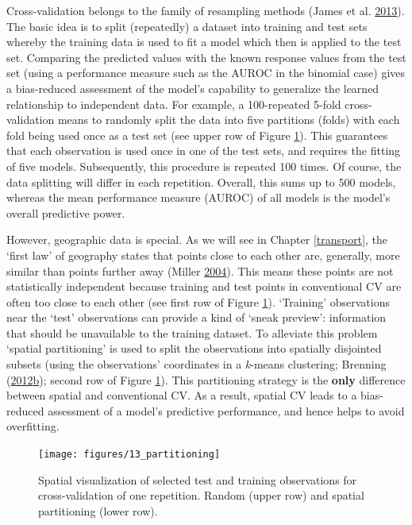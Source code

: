 \documentclass[]{krantz}
\begin{document}
Cross-validation belongs to the family of resampling methods (James et al. \protect\hyperlink{ref-james_introduction_2013}{2013}).
The basic idea is to split (repeatedly) a dataset into training and test sets whereby the training data is used to fit a model which then is applied to the test set.
Comparing the predicted values with the known response values from the test set (using a performance measure such as the AUROC in the binomial case) gives a bias-reduced assessment of the model's capability to generalize the learned relationship to independent data.
For example, a 100-repeated 5-fold cross-validation means to randomly split the data into five partitions (folds) with each fold being used once as a test set (see upper row of Figure \ref{fig:partitioning}).
This guarantees that each observation is used once in one of the test sets, and requires the fitting of five models.
Subsequently, this procedure is repeated 100 times.
Of course, the data splitting will differ in each repetition.
Overall, this sums up to 500 models, whereas the mean performance measure (AUROC) of all models is the model's overall predictive power.

However, geographic data is special.
As we will see in Chapter \ref{transport}, the `first law' of geography states that points close to each other are, generally, more similar than points further away (Miller \protect\hyperlink{ref-miller_tobler_2004}{2004}).
This means these points are not statistically independent because training and test points in conventional CV are often too close to each other (see first row of Figure \ref{fig:partitioning}).
`Training' observations near the `test' observations can provide a kind of `sneak preview':
information that should be unavailable to the training dataset.
To alleviate this problem `spatial partitioning' is used to split the observations into spatially disjointed subsets (using the observations' coordinates in a \emph{k}-means clustering; Brenning (\protect\hyperlink{ref-brenning_spatial_2012}{2012}\protect\hyperlink{ref-brenning_spatial_2012}{b}); second row of Figure \ref{fig:partitioning}).
This partitioning strategy is the \textbf{only} difference between spatial and conventional CV.
As a result, spatial CV leads to a bias-reduced assessment of a model's predictive performance, and hence helps to avoid overfitting.

\begin{figure}[t]

{\centering \texttt{[image: figures/13\_partitioning]} 

}

\caption[Spatial visualization of selected test and training observations.]{Spatial visualization of selected test and training observations for cross-validation of one repetition. Random (upper row) and spatial partitioning (lower row).}\label{fig:partitioning}
\end{figure}
\end{document}

